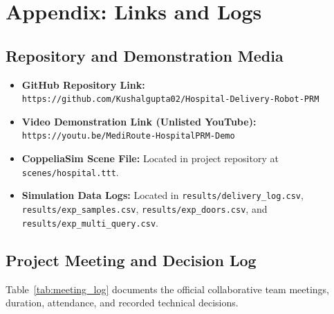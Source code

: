 \documentclass[12pt,a4paper]{article}
\begin{document}
\newpage

\section*{Appendix: Links and Logs}

\subsection*{Repository and Demonstration Media}
\begin{itemize}[itemsep=2pt,topsep=2pt]
\item \textbf{GitHub Repository Link:} \texttt{https://github.com/Kushalgupta02/Hospital-Delivery-Robot-PRM}
\item \textbf{Video Demonstration Link (Unlisted YouTube):} \texttt{https://youtu.be/MediRoute-HospitalPRM-Demo}
\item \textbf{CoppeliaSim Scene File:} Located in project repository at \texttt{scenes/hospital.ttt}.
\item \textbf{Simulation Data Logs:} Located in \texttt{results/delivery\_log.csv}, \texttt{results/exp\_samples.csv}, \texttt{results/exp\_doors.csv}, and \texttt{results/exp\_multi\_query.csv}.
\end{itemize}

\subsection*{Project Meeting and Decision Log}
Table~\ref{tab:meeting_log} documents the official collaborative team meetings, duration, attendance, and recorded technical decisions.
\end{document}
